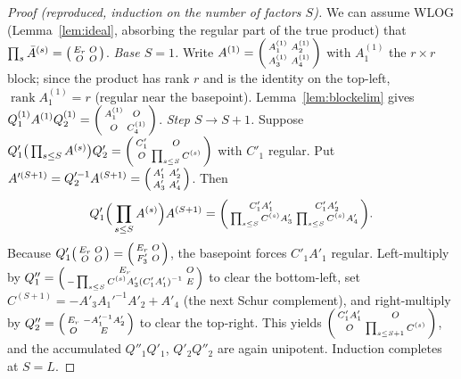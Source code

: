 \documentclass[11pt]{article}
\theoremstyle{plain}
\theoremstyle{definition}
\theoremstyle{remark}
\newcommand{\rk}{\operatorname{rank}}
\begin{document}
\begin{proof}[Proof (reproduced, induction on the number of factors $S$)]
We can assume WLOG (Lemma~\ref{lem:ideal}, absorbing the regular part of the true
product) that $\prod_s\bar A^{(s)}=\begin{psmallmatrix}E_r&O\\O&O\end{psmallmatrix}$.
\emph{Base $S=1$.} Write $A^{(1)}=\begin{psmallmatrix}A^{(1)}_1&A^{(1)}_2\\A^{(1)}_3&A^{(1)}_4\end{psmallmatrix}$
with $A^{(1)}_1$ the $r\times r$ block; since the product has rank $r$ and is the
identity on the top-left, $\rk A^{(1)}_1=r$ (regular near the basepoint). Lemma~\ref{lem:blockelim}
gives $Q^{(1)}_1A^{(1)}Q^{(1)}_2=\begin{psmallmatrix}A^{(1)}_1&O\\O&C^{(1)}_4\end{psmallmatrix}$.
\emph{Step $S\to S+1$.} Suppose
$Q'_1\big(\prod_{s\le S}A^{(s)}\big)Q'_2=\begin{psmallmatrix}C'_1&O\\O&\prod_{s\le S}C^{(s)}\end{psmallmatrix}$
with $C'_1$ regular. Put $A'^{(S+1)}=Q_2'^{-1}A^{(S+1)}=\begin{psmallmatrix}A'_1&A'_2\\A'_3&A'_4\end{psmallmatrix}$.
Then
\[
 Q'_1\Big(\prod_{s\le S}A^{(s)}\Big)A^{(S+1)}
 =\begin{psmallmatrix}C'_1A'_1&C'_1A'_2\\ \prod_{s\le S}C^{(s)}A'_3 & \prod_{s\le S}C^{(s)}A'_4\end{psmallmatrix}.
\]
Because $Q'_1\begin{psmallmatrix}E_r&O\\O&O\end{psmallmatrix}=\begin{psmallmatrix}E_r&O\\F'_3&O\end{psmallmatrix}$,
the basepoint forces $C'_1A'_1$ regular. Left-multiply by
$Q''_1=\begin{psmallmatrix}E_r&O\\-\prod_{s\le S}C^{(s)}A'_3(C'_1A'_1)^{-1}&E\end{psmallmatrix}$
to clear the bottom-left, set $C^{(S+1)}=-A'_3A_1'^{-1}A'_2+A'_4$ (the next Schur
complement), and right-multiply by $Q''_2=\begin{psmallmatrix}E_r&-A_1'^{-1}A'_2\\O&E\end{psmallmatrix}$
to clear the top-right. This yields
$\begin{psmallmatrix}C'_1A'_1&O\\O&\prod_{s\le S+1}C^{(s)}\end{psmallmatrix}$, and the
accumulated $Q''_1Q'_1$, $Q'_2Q''_2$ are again unipotent. Induction completes at $S=L$.
\end{proof}
\end{document}
